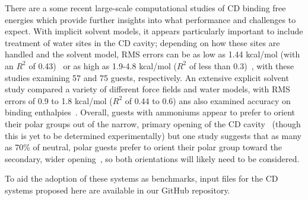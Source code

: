 \documentclass[aps,pre,twocolumn,nofootinbib,superscriptaddress,10pt, final,tightenlines]{revtex4-1}
\begin{document}
There are a some recent large-scale computational studies of CD binding free energies which provide further insights into what performance and challenges to expect.
With implicit solvent models, it appears particularly important to include treatment of water sites in the CD cavity; depending on how these sites are handled and the solvent model, RMS errors can be as low as 1.44 kcal/mol (with an $R^2$ of 0.43)~\cite{Wickstrom:2013:J.Chem.TheoryComput.} or as high as 1.9-4.8 kcal/mol ($R^2$ of less than 0.3)~\cite{zhang_evaluation_2016}, with these studies examining 57 and 75 guests, respectively.
An extensive explicit solvent study compared a variety of different force fields and water models, with RMS errors of 0.9 to 1.8 kcal/mol ($R^2$ of 0.44 to 0.6) ans also examined accuracy on binding enthalpies~\cite{henriksen_evaluating_2017}.
Overall, guests with ammoniums appear to prefer to orient their polar groups out of the narrow, primary opening of the CD cavity~\cite{Wickstrom:2013:J.Chem.TheoryComput., henriksen_evaluating_2017} (though this is yet to be determined experimentally) but one study suggests that as many as 70\% of neutral, polar guests prefer to orient their polar group toward the secondary, wider opening~\cite{zhang_evaluation_2016}, so both orientations will likely need to be considered.
   

To aid the adoption of these systems as benchmarks, input files for the CD systems proposed here are available in our GitHub repository.
\end{document}
